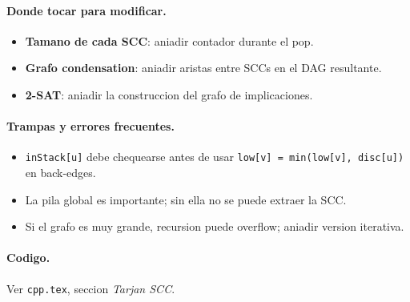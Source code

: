 \paragraph{Donde tocar para modificar.}
\begin{itemize}\setlength\itemsep{0pt}
	\item \textbf{Tamano de cada SCC}: aniadir contador durante el pop.
	\item \textbf{Grafo condensation}: aniadir aristas entre SCCs en el DAG resultante.
	\item \textbf{2-SAT}: aniadir la construccion del grafo de implicaciones.
\end{itemize}

\paragraph{Trampas y errores frecuentes.}
\begin{itemize}\setlength\itemsep{0pt}
	\item \texttt{inStack[u]} debe chequearse antes de usar \texttt{low[v] = min(low[v], disc[u])} en back-edges.
	\item La pila global es importante; sin ella no se puede extraer la SCC.
	\item Si el grafo es muy grande, recursion puede overflow; aniadir version iterativa.
\end{itemize}

\paragraph{Codigo.}
Ver \texttt{cpp.tex}, seccion \textit{Tarjan SCC}.
